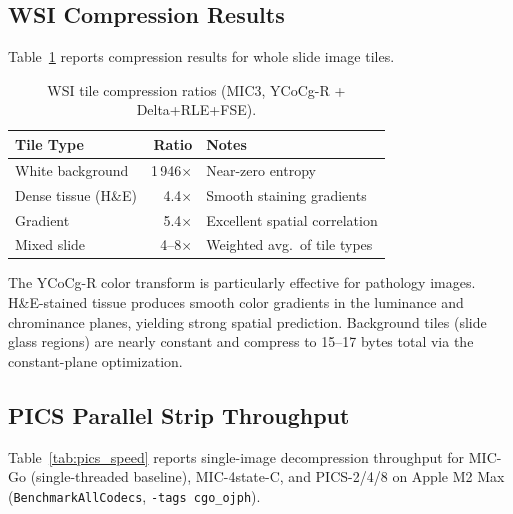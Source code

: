 \documentclass[11pt,twocolumn]{article}
\begin{document}
\subsection{WSI Compression Results}

Table~\ref{tab:wsi} reports compression results for whole slide image tiles.

\begin{table}[t]
\centering
\caption{WSI tile compression ratios (MIC3, YCoCg-R + Delta+RLE+FSE).}
\label{tab:wsi}
\small
\begin{tabular}{@{}lrl@{}}
\toprule
Tile Type & Ratio & Notes \\
\midrule
White background & 1\,946$\times$ & Near-zero entropy \\
Dense tissue (H\&E) & 4.4$\times$ & Smooth staining gradients \\
Gradient & 5.4$\times$ & Excellent spatial correlation \\
Mixed slide & 4--8$\times$ & Weighted avg.\ of tile types \\
\bottomrule
\end{tabular}
\end{table}

The YCoCg-R color transform is particularly effective for pathology images.
H\&E-stained tissue produces smooth color gradients in the luminance and chrominance planes, yielding strong spatial prediction.
Background tiles (slide glass regions) are nearly constant and compress to 15--17 bytes total via the constant-plane optimization.

\subsection{PICS Parallel Strip Throughput}
\label{sec:pics_results}

Table~\ref{tab:pics_speed} reports single-image decompression throughput for MIC-Go (single-threaded baseline), MIC-4state-C, and PICS-2/4/8 on Apple M2 Max (\texttt{BenchmarkAllCodecs}, \texttt{-tags cgo\_ojph}).
\end{document}
